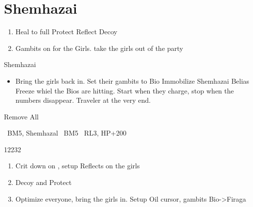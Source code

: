 \chapter{Shemhazai}

\begin{enumerate}
\item Heal \vaan to full
\vaanf Protect \vaan
\penelof Reflect \vaan
\ashef Decoy \vaan
\item Gambits on for the Girls. take the girls out of the party
\end{enumerate}
\begin{battle}{Shemhazai}
\begin{itemize}
\item Bring the girls back in. Set their gambits to Bio
\vaanf Immobilize Shemhazai
\vaanf Belias Freeze whiel the Bios are hitting. Start when they charge, stop when the numbers disappear.
\vaanf Traveler at the very end.
\end{itemize}
\end{battle}
\begin{equip}
Remove All
\end{equip}
\begin{liscense}
\ashe\ BM5, Shemhazal
\penelo\ BM5
\vaan\ RL3, HP+200
\end{liscense}
\begin{shop}{12232}
\end{shop}
\begin{enumerate}
\item Crit down on \penelo, setup Reflects on the girls
\item Decoy and Protect \vaan
\item Optimize everyone, bring the girls in. Setup Oil cursor, gambits Bio->Firaga
\end{enumerate}